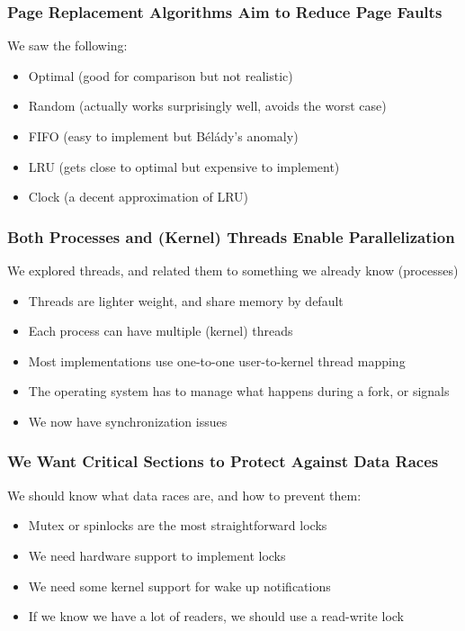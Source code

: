   \begin{frame}
    \frametitle{Page Replacement Algorithms Aim to Reduce Page Faults}

    We saw the following:
    \begin{itemize}
      \item Optimal (good for comparison but not realistic)
      \item Random (actually works surprisingly well, avoids the worst case)
      \item FIFO (easy to implement but Bélády's anomaly)
      \item LRU (gets close to optimal but expensive to implement)
      \item Clock (a decent approximation of LRU)
    \end{itemize}
  \end{frame}

  \begin{frame}
    \frametitle{Both Processes and (Kernel) Threads Enable Parallelization}

    We explored threads, and related them to something we already know (processes)
    \begin{itemize}
      \item Threads are lighter weight, and share memory by default
      \item Each process can have multiple (kernel) threads
      \item Most implementations use one-to-one user-to-kernel thread mapping
      \item The operating system has to manage what happens during a fork, or signals
      \item We now have synchronization issues
    \end{itemize}
  \end{frame}

  \begin{frame}
    \frametitle{We Want Critical Sections to Protect Against Data Races}

    We should know what data races are, and how to prevent them:
    \begin{itemize}
      \item Mutex or spinlocks are the most straightforward locks
      \item We need hardware support to implement locks
      \item We need some kernel support for wake up notifications
      \item If we know we have a lot of readers, we should use a read-write lock
    \end{itemize}
  \end{frame}

